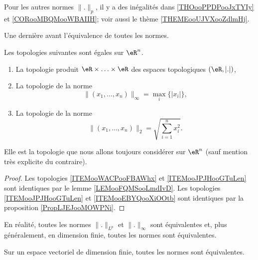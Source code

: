 Pour les autres normes \( \| . \|_p\), il y a des inégalités dans \ref{THOooPPDPooJxTYIy} et \ref{CORooMBQMooWBAIIH}; voir aussi le thème \ref{THEMEooUJVXooZdlmHj}.

Une dernière avant l'équivalence de toutes les normes.
\begin{propositionDef}
	Les topologies suivantes sont égales sur \( \eR^n\).
	\begin{enumerate}
		\item       \label{ITEMooWACPooFBAWhx}
		      La topologie produit \( \eR\times \ldots\times \eR\) des espaces topologiques \( (\eR,| . |)\),
		\item       \label{ITEMooJPJHooGTuLen}
		      La topologie de la norme
		      \begin{equation}
			      \| (x_1,\ldots, x_n) \|_{\infty}=\max_i\{ | x_i | \},
		      \end{equation}
		\item       \label{ITEMooEBYQooXiOOtb}
		      La topologie de la norme
		      \begin{equation}
			      \| (x_1,\ldots, x_n) \|_2=\sqrt{ \sum_{i=1}^nx_i^2 }.
		      \end{equation}
	\end{enumerate}
	Elle est la topologie que nous allons toujours considérer sur \( \eR^n\) (sauf mention très explicite du contraire).
\end{propositionDef}

\begin{proof}
	Les topologies \ref{ITEMooWACPooFBAWhx} et \ref{ITEMooJPJHooGTuLen} sont identiques par le lemme \ref{LEMooFQMSooLmdIvD}. Les topologies \ref{ITEMooJPJHooGTuLen} et \ref{ITEMooEBYQooXiOOtb} sont identiques par la proposition \ref{PropLJEJooMOWPNi}.
\end{proof}

En réalité, toutes les normes \( \| . \|_{L^p}\) et \( \| . \|_{\infty}\) sont équivalentes et, plus généralement, en dimension finie, toutes les normes sont équivalentes.
\begin{theorem}    \label{ThoNormesEquiv}
	Sur un espace vectoriel de dimension finie, toutes les normes sont équivalentes.
\end{theorem}

